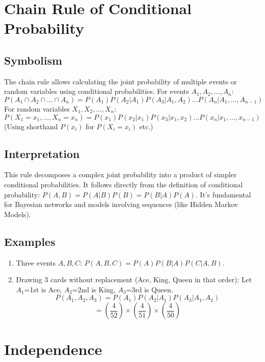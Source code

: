 \documentclass{article}
\begin{document}
\section{Chain Rule of Conditional Probability}

\subsection*{Symbolism}
The chain rule allows calculating the joint probability of multiple events or random variables using conditional probabilities. For events $A_1, A_2, \dots, A_n$:
\[ P(A_1 \cap A_2 \cap \dots \cap A_n) = P(A_1) P(A_2|A_1) P(A_3|A_1, A_2) \dots P(A_n|A_1, \dots, A_{n-1}) \]
For random variables $X_1, X_2, \dots, X_n$:
\[ P(X_1=x_1, \dots, X_n=x_n) = P(x_1) P(x_2|x_1) P(x_3|x_1, x_2) \dots P(x_n|x_1, \dots, x_{n-1}) \]
(Using shorthand $P(x_i)$ for $P(X_i=x_i)$ etc.)

\subsection*{Interpretation}
This rule decomposes a complex joint probability into a product of simpler conditional probabilities. It follows directly from the definition of conditional probability: $P(A, B) = P(A|B)P(B) = P(B|A)P(A)$. It's fundamental for Bayesian networks and models involving sequences (like Hidden Markov Models).

\subsection*{Examples}
\begin{enumerate}
    \item Three events $A, B, C$: $P(A, B, C) = P(A) P(B|A) P(C|A, B)$.
    \item Drawing 3 cards without replacement (Ace, King, Queen in that order):
    Let $A_1$=1st is Ace, $A_2$=2nd is King, $A_3$=3rd is Queen.
    \[ P(A_1, A_2, A_3) = P(A_1) P(A_2|A_1) P(A_3|A_1, A_2) \]
    \[ = \left(\frac{4}{52}\right) \times \left(\frac{4}{51}\right) \times \left(\frac{4}{50}\right) \]
\end{enumerate}

\section{Independence}
\end{document}
